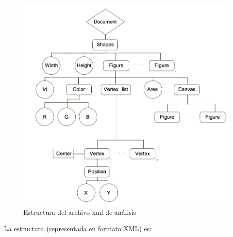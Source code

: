 			\begin{figure}[htbp]
			\centering
			\includegraphics[scale=0.35]{graphics/xml-representation.png}
			\caption{Estructura del archivo xml de análisis}
			\label{fig:estructuraFiguras}
			\end{figure}
		
	La estructura (representada en formato XML) es:\\
	
	
